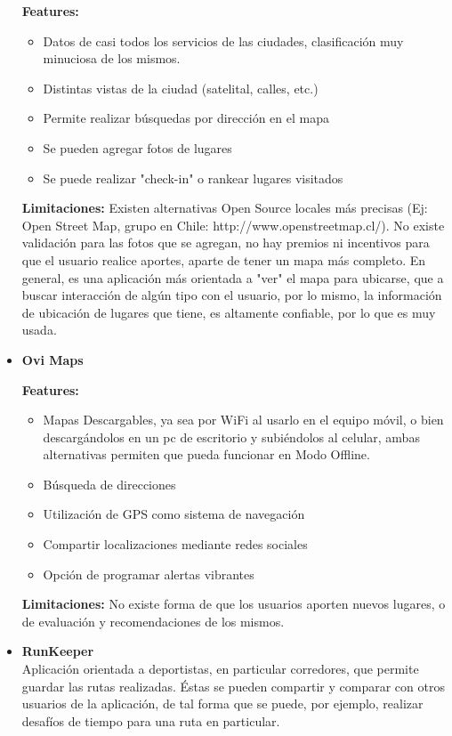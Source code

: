 \documentclass[10pt,letterpaper]{article}
\begin{document}
\begin{itemize}
\textbf{Features:}
\begin{itemize}
\item Datos de casi todos los servicios de las ciudades, clasificación muy minuciosa de los mismos.
\item Distintas vistas de la ciudad (satelital, calles, etc.)
\item Permite realizar búsquedas por dirección en el mapa
\item Se pueden agregar fotos de lugares
\item Se puede realizar "check-in" o rankear lugares visitados
\end{itemize}

\textbf{Limitaciones:} Existen alternativas Open Source locales más precisas (Ej: Open Street Map, grupo en Chile: http://www.openstreetmap.cl/). No existe validación para las fotos que se agregan, no hay premios ni incentivos para que el usuario realice aportes, aparte de tener un mapa más completo. En general, es una aplicación más orientada a "ver" el mapa para ubicarse, que a buscar interacción de algún tipo con el usuario, por lo mismo, la información de ubicación de lugares que tiene, es altamente confiable, por lo que es muy usada.\\

\item \textbf{Ovi Maps}

\textbf{Features:}
\begin{itemize}
\item Mapas Descargables, ya sea por WiFi al usarlo en el equipo móvil, o bien descargándolos en un pc de escritorio y subiéndolos al celular, ambas alternativas permiten que pueda funcionar en Modo Offline.
\item Búsqueda de direcciones
\item Utilización de GPS como sistema de navegación
\item Compartir localizaciones mediante redes sociales
\item Opción de programar alertas vibrantes
\end{itemize}

\textbf{Limitaciones:} No existe forma de que los usuarios aporten nuevos lugares, o de evaluación y recomendaciones de los mismos.\\

\item \textbf{RunKeeper}\\

Aplicación orientada a deportistas, en particular corredores, que permite guardar las rutas realizadas. Éstas se pueden compartir y comparar con otros usuarios de la aplicación, de tal forma que se puede, por ejemplo, realizar desafíos de tiempo para una ruta en particular.\\


\end{itemize}
\end{document}
